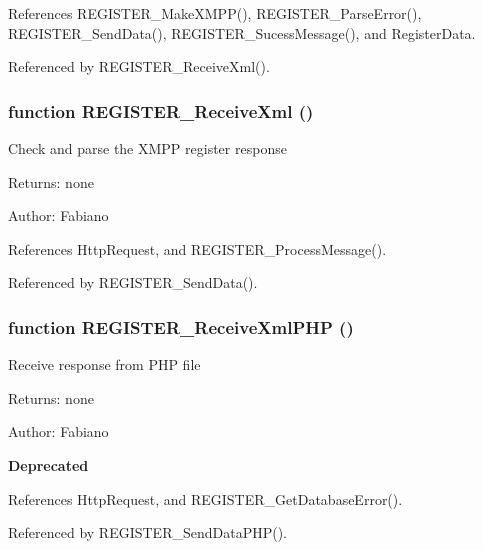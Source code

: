 References REGISTER\_\-MakeXMPP(), REGISTER\_\-ParseError(), REGISTER\_\-SendData(), REGISTER\_\-SucessMessage(), and RegisterData.

Referenced by REGISTER\_\-ReceiveXml().
\subsubsection{\setlength{\rightskip}{0pt plus 5cm}function REGISTER\_\-ReceiveXml ()}\label{register_8js_529d8fd46e940d2c418616e7288a9bef}


Check and parse the XMPP register response

\begin{Desc}
\item[Returns:]none \end{Desc}
\begin{Desc}
\item[Author:]Fabiano \end{Desc}


References HttpRequest, and REGISTER\_\-ProcessMessage().

Referenced by REGISTER\_\-SendData().
\subsubsection{\setlength{\rightskip}{0pt plus 5cm}function REGISTER\_\-ReceiveXmlPHP ()}\label{register_8js_05f0881d7603861b5b37ec98d0468d42}


Receive response from PHP file \begin{Desc}
\item[Returns:]none\end{Desc}
\begin{Desc}
\item[Author:]Fabiano \end{Desc}
\begin{Desc}
\item[{\bf Deprecated}]\end{Desc}


References HttpRequest, and REGISTER\_\-GetDatabaseError().

Referenced by REGISTER\_\-SendDataPHP().
